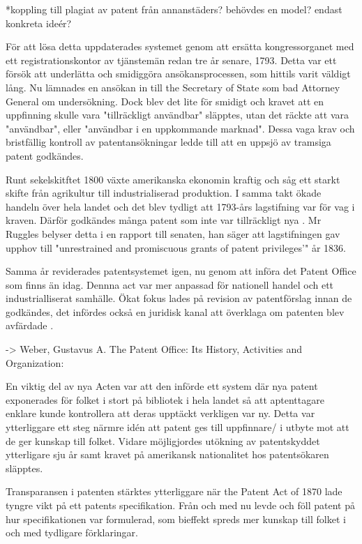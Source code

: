 *koppling till plagiat av patent från annanstäders? behövdes en model? endast konkreta ideér?

För att lösa detta uppdaterades systemet genom att ersätta kongressorganet med ett registrationskontor
av tjänstemän redan tre år senare, 1793. Detta var ett försök att underlätta och smidiggöra
ansökansprocessen, som hittils varit väldigt lång. Nu lämnades en ansökan in till the Secretary of State
som bad Attorney General om undersökning. Dock blev det lite för smidigt och kravet att en uppfinning
skulle vara "tillräckligt användbar" släpptes, utan det räckte att vara "användbar", eller "användbar i
en uppkommande marknad". Dessa vaga krav och bristfällig kontroll av patentansökningar ledde till att en
uppsjö av tramsiga patent godkändes\cite{nard}.

Runt sekelskitftet 1800 växte amerikanska ekonomin kraftig och såg ett starkt skifte från agrikultur
till industrialiserad produktion. I samma takt ökade handeln över hela landet och det blev tydligt att 1793-års lagstifning var för vag i kraven. Därför godkändes många patent som inte var tillräckligt nya \cite{nard}. Mr Ruggles belyser detta i en rapport till senaten, han säger att lagstifningen gav upphov till "unrestrained and promiscuous grants of patent privileges’" \cite{ruggles} år 1836.

Samma år reviderades patentsystemet igen, nu genom att införa det Patent
Office som finns än idag. Dennna act var mer anpassad för nationell handel och ett industrialliserat samhälle. Ökat fokus lades på revision av patentförslag innan
de godkändes, det infördes också en juridisk kanal att överklaga om patenten blev avfärdade \cite{nard}.

-> Weber, Gustavus A. The Patent Office: Its History, Activities and Organization:

En viktig del av nya Acten var att den införde ett system där nya patent exponerades för folket i stort
på bibliotek i hela landet så att aptenttagare enklare kunde kontrollera att deras upptäckt verkligen
var ny\cite{watson}. Detta var ytterliggare ett steg närmre idén att patent ges till uppfinnare/ i
utbyte mot att de ger kunskap till folket. Vidare möjligjordes utökning av patentskyddet ytterligare sju
år \cite{watson} samt kravet på amerikansk nationalitet hos patentsökaren släpptes.

Transparansen i patenten stärktes ytterliggare när the Patent Act of 1870 lade tyngre vikt på ett
patents specifikation. Från och med nu levde och föll patent på hur specifikationen var formulerad, som
bieffekt spreds mer kunskap till folket i och med tydligare förklaringar\cite{nard}.


